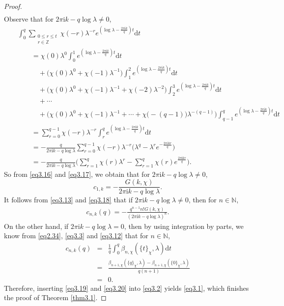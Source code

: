 \documentclass[10pt,a4paper]{amsart}
\begin{document}
\begin{proof}
\begin{eqnarray}
\end{eqnarray}
Observe that for $2\pi\mathrm{i}k-q\log\lambda\neq0$,
\begin{eqnarray}\label{eq3.17}
&&\int_{0}^{q}\underset{\substack{0\leqslant r\leqslant t\\ r\in\mathbb{Z}}}{\sum}\chi(-r)\lambda^{-r}e^{(\log\lambda-\frac{2\pi\mathrm{i}k}{q})t}\text{d}t\nonumber\\
&&\qquad=\chi(0)\lambda^{0}\int_{0}^{1}e^{(\log\lambda-\frac{2\pi\mathrm{i}k}{q})t}\text{d}t\nonumber\\
&&\qquad\quad+\bigl(\chi(0)\lambda^{0}+\chi(-1)\lambda^{-1}\bigl)\int_{1}^{2}e^{(\log\lambda-\frac{2\pi\mathrm{i}k}{q})t}\text{d}t\nonumber\\
&&\qquad\quad+\bigl(\chi(0)\lambda^{0}+\chi(-1)\lambda^{-1}+\chi(-2)\lambda^{-2}\bigl)\int_{2}^{3}e^{(\log\lambda-\frac{2\pi\mathrm{i}k}{q})t}\text{d}t\nonumber\\
&&\qquad\quad+\cdots\nonumber\\
&&\qquad\quad+\bigl(\chi(0)\lambda^{0}+\chi(-1)\lambda^{-1}+\cdots+\chi\bigl(-(q-1)\bigl)\lambda^{-(q-1)}\bigl)\int_{q-1}^{q}e^{(\log\lambda-\frac{2\pi\mathrm{i}k}{q})t}\text{d}t\nonumber\\
&&\qquad=\sum_{r=0}^{q-1}\chi(-r)\lambda^{-r}\int_{r}^{q}e^{(\log\lambda-\frac{2\pi\mathrm{i}k}{q})t}\text{d}t\nonumber\\
&&\qquad=-\frac{q}{2\pi\mathrm{i}k-q\log\lambda}\sum_{r=0}^{q-1}\chi(-r)\lambda^{-r}\bigl(\lambda^{q}-\lambda^{r}e^{-\frac{2\pi\mathrm{i}kr}{q}}\bigl)\nonumber\\
&&\qquad=-\frac{q}{2\pi\mathrm{i}k-q\log\lambda}\biggl(\sum_{r=1}^{q}\chi(r)\lambda^{r}-\sum_{r=1}^{q}\chi(r)e^{\frac{2\pi\mathrm{i}kr}{q}}\biggl).
\end{eqnarray}
So from \eqref{eq3.16} and \eqref{eq3.17}, we obtain that for $2\pi\mathrm{i}k-q\log\lambda\neq0$,
\begin{equation}\label{eq3.18}
c_{1,k}=-\frac{G(k,\chi)}{2\pi\mathrm{i}k-q\log\lambda}.
\end{equation}
It follows from \eqref{eq3.13} and \eqref{eq3.18} that if $2\pi\mathrm{i}k-q\log\lambda\neq0$, then for $n\in\mathbb{N}$,
\begin{eqnarray}\label{eq3.19}
c_{n,k}(q)=-\frac{q^{n-1}n!G(k,\chi)}{(2\pi\mathrm{i}k-q\log\lambda)^{n}}.
\end{eqnarray}
On the other hand, if $2\pi\mathrm{i}k-q\log\lambda=0$, then by using integration by parts, we know from \eqref{eq2.34}, \eqref{eq3.3} and \eqref{eq3.12} that for $n\in\mathbb{N}$,
\begin{eqnarray}\label{eq3.20}
c_{n,k}(q)&=&\frac{1}{q}\int_{0}^{q}\beta_{n,\chi}(\{t\}_{\chi},\lambda)\text{d}t\nonumber\\
&=&\frac{\beta_{n+1,\chi}(\{q\}_{\chi},\lambda)-\beta_{n+1,\chi}(\{0\}_{\chi},\lambda)}{q(n+1)}\nonumber\\
&=&0.
\end{eqnarray}
Therefore, inserting \eqref{eq3.19} and \eqref{eq3.20} into \eqref{eq3.2} yields \eqref{eq3.1}, which finishes the proof of Theorem \ref{thm3.1}.
\end{proof}
\end{document}
